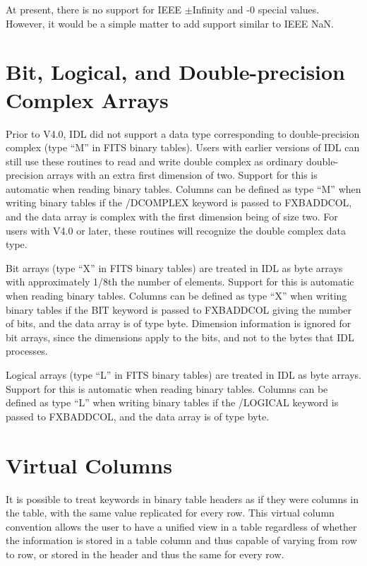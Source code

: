 At present, there is no support for IEEE $\pm$Infinity and -0 special values.
However, it would be a simple matter to add support similar to IEEE NaN.

\section{Bit, Logical, and Double-precision Complex Arrays}

Prior to V4.0, IDL did not support a data type corresponding to double-precision
complex (type ``M'' in FITS binary tables).   Users with earlier versions of
IDL can still use these routines to read and write
double complex as ordinary double-precision arrays with an extra first
dimension of two.  Support for this is automatic when reading binary tables.
Columns can be defined as type ``M'' when writing binary tables if the
/DCOMPLEX keyword is passed to FXBADDCOL, and the data array is complex with
the first dimension being of size two.    For users with V4.0 or later,
these routines will recognize the double complex data type.

Bit arrays (type ``X'' in FITS binary tables) are treated in IDL as byte arrays
with approximately 1/8th the number of elements.  Support for this is automatic
when reading binary tables.  Columns can be defined as type ``X'' when writing
binary tables if the BIT keyword is passed to FXBADDCOL giving the number of
bits, and the data array is of type byte.  Dimension information is ignored for
bit arrays, since the dimensions apply to the bits, and not to the bytes that
IDL processes.

Logical arrays (type ``L'' in FITS binary tables) are treated in IDL as byte
arrays.  Support for this is automatic when reading binary tables.  Columns can
be defined as type ``L'' when writing binary tables if the /LOGICAL keyword is
passed to FXBADDCOL, and the data array is of type byte.

\section{Virtual Columns}

It is possible to treat keywords in binary table headers as if they were
columns in the table, with the same value replicated for every row.  This
virtual column convention allows the user to have a unified view in a table
regardless of whether the information is stored in a table column and thus
capable of varying from row to row, or stored in the header and thus the same
for every row.

